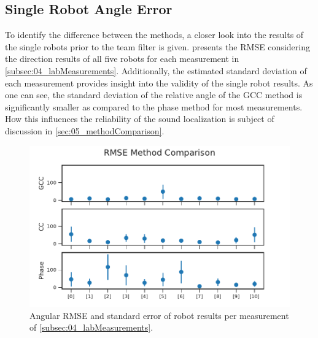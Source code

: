 \subsection{Single Robot Angle Error}
\label{subsec:04_singleRobotAngleError}

To identify the difference between the methods, a closer look
into the results of the single robots prior to the team filter is given.
 presents the \ac{RMSE} considering the
direction results of all five robots for each measurement in
\cref{subsec:04_labMeasurements}.
Additionally, the estimated standard deviation of each measurement
provides insight into the validity of the single robot results.
As one can see, the standard deviation of the relative angle of the \ac{GCC}
method is significantly smaller as compared to the phase method for most
measurements.
How this influences the reliability of the sound localization is
subject of discussion in \cref{sec:05_methodComparison}.
\begin{figure}[ht]
	\centering
		\includegraphics[]{figures/evaluation/compare_rmse}
	\caption{Angular RMSE and standard error of robot results per
	measurement of \cref{subsec:04_labMeasurements}.}
    \label{fig:04_compareRmse}
\end{figure}

